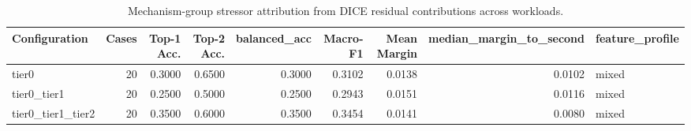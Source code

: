 \begin{table}[t]
\centering
\caption{Mechanism-group stressor attribution from DICE residual contributions across workloads.}
\label{tab:dice_stressor_diagnosis}
\footnotesize
\begin{tabular}{lrrrrrrrl}
\toprule
Configuration & Cases & Top-1 Acc. & Top-2 Acc. & balanced_acc & Macro-F1 & Mean Margin & median_margin_to_second & feature_profile \\
\midrule
tier0 & 20 & 0.3000 & 0.6500 & 0.3000 & 0.3102 & 0.0138 & 0.0102 & mixed \\
tier0_tier1 & 20 & 0.2500 & 0.5000 & 0.2500 & 0.2943 & 0.0151 & 0.0116 & mixed \\
tier0_tier1_tier2 & 20 & 0.3500 & 0.6000 & 0.3500 & 0.3454 & 0.0141 & 0.0080 & mixed \\
\bottomrule
\end{tabular}

\end{table}
